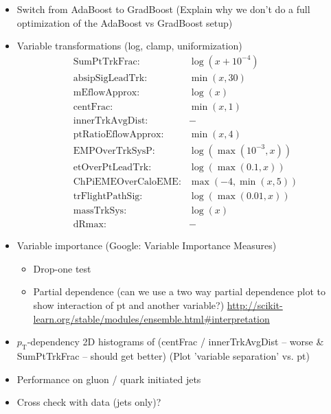 \begin{itemize}
\item Switch from AdaBoost to GradBoost (Explain why we don't do a full
  optimization of the AdaBoost vs GradBoost setup)

\item Variable transformations (log, clamp, uniformization)
  \begin{align}
    &\text{SumPtTrkFrac:} &\log(x + 10^{-4}) \\
    &\text{absipSigLeadTrk:} &\min(x, 30) \\
    &\text{mEflowApprox:} &\log(x) \\
    &\text{centFrac:} &\min(x, 1) \\
    &\text{innerTrkAvgDist:} &- \\
    &\text{ptRatioEflowApprox:} &\min(x, 4) \\
    &\text{EMPOverTrkSysP:} &\log(\max(10^{-3}, x)) \\
    &\text{etOverPtLeadTrk:} &\log(\max(0.1, x)) \\
    &\text{ChPiEMEOverCaloEME:} &\max(-4, \min(x, 5)) \\
    &\text{trFlightPathSig:} &\log(\max(0.01, x)) \\
    &\text{massTrkSys:} &\log(x) \\
    &\text{dRmax:} &-
  \end{align}

\item Variable importance (Google: Variable Importance Measures)
  \begin{itemize}
  \item Drop-one test
  \item Partial dependence (can we use a two way partial dependence plot to
    show interaction of pt and another variable?)
    \url{http://scikit-learn.org/stable/modules/ensemble.html#interpretation}
  \end{itemize}

\item $p_\mathrm{T}$-dependency 2D histograms of (centFrac / innerTrkAvgDist --
  worse \& SumPtTrkFrac -- should get better) (Plot 'variable separation' vs.
  pt)

\item Performance on gluon / quark initiated jets

\item Cross check with data (jets only)?

\end{itemize}

